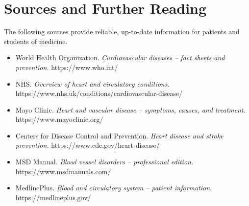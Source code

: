 \section*{Sources and Further Reading}
The following sources provide reliable, up-to-date information for patients and students of medicine.

\begin{itemize}
    \item World Health Organization. \textit{Cardiovascular diseases -- fact sheets and prevention.} https://www.who.int/
    \item NHS. \textit{Overview of heart and circulatory conditions.} https://www.nhs.uk/conditions/cardiovascular-disease/
    \item Mayo Clinic. \textit{Heart and vascular disease -- symptoms, causes, and treatment.} https://www.mayoclinic.org/
    \item Centers for Disease Control and Prevention. \textit{Heart disease and stroke prevention.} https://www.cdc.gov/heart-disease/
    \item MSD Manual. \textit{Blood vessel disorders -- professional edition.} https://www.msdmanuals.com/
    \item MedlinePlus. \textit{Blood and circulatory system -- patient information.} https://medlineplus.gov/
\end{itemize}

